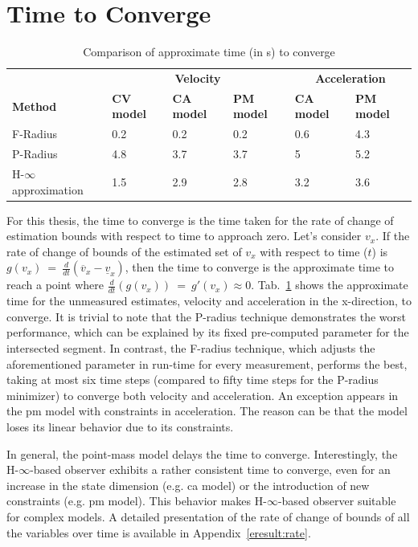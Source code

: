 \section{Time to Converge}
\begin{table}[!h]
\caption{Comparison of approximate time (in s) to converge}
	\centering
	\renewcommand{\arraystretch}{1.1}
	\small	
	\begin{tabular}{l l l l l l}
		\toprule 
		
		& \multicolumn{3}{c}{\textbf{Velocity}} & \multicolumn{2}{c}{\textbf{Acceleration}}\\ \cmidrule(l){2-4} \cmidrule(l){5-6}
		\textbf{Method} & \textbf{CV model} & \textbf{CA model} & \textbf{PM model} & \textbf{CA model} & \textbf{PM model}\\ \midrule
		F-Radius & 0.2 & 0.2 & 0.2 & 0.6 & 4.3\\
		P-Radius & 4.8 & 3.7 & 3.7 & 5 & 5.2 \\
		H-$\infty$ approximation & 1.5 & 2.9 & 2.8 & 3.2 & 3.6\\
		\bottomrule
	\end{tabular}
	\label{tab:convtime}
\end{table}
For this thesis, the time to converge is the time taken for the rate of change of estimation bounds with respect to time to approach zero. Let's consider $v_x$. If the rate of change of bounds of the estimated set of $v_x$ with respect to time ($t$) is $g(v_x)~=~\frac{d}{dt} (\overline{v}_x - \underline{v}_x)$, then the time to converge is the approximate time to reach a point where ${\frac{d}{dt}(g(v_x))~=~g'(v_x) \approx 0}$.  Tab.~\ref{tab:convtime} shows the approximate time for the unmeasured estimates, velocity and acceleration in the x-direction, to converge. It is trivial to note that the P-radius technique demonstrates the worst performance, which can be explained by its fixed pre-computed parameter for the intersected segment. In contrast, the F-radius technique, which adjusts the aforementioned parameter in run-time for every measurement, performs the best, taking at most six time steps (compared to fifty time steps for the P-radius minimizer) to converge both velocity and acceleration. An exception appears in the pm model with constraints in acceleration. The reason can be that the model loses its linear behavior due to its constraints. 

In general, the point-mass model delays the time to converge. Interestingly, the H-$\infty$-based observer exhibits a rather consistent time to converge, even for an increase in the state dimension (e.g. ca model) or the introduction of new constraints (e.g. pm model). This behavior makes H-$\infty$-based observer suitable for complex models. A detailed presentation of the rate of change of bounds of all the variables over time is available in Appendix~\ref{eresult:rate}. 

